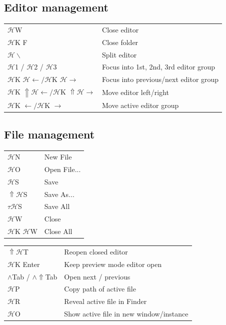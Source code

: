\documentclass[UTF8]{article}
\begin{document}
\subsection*{Editor management}
\begin{tabular}{ll}
$\mathscr{H}$W & Close editor \\
$\mathscr{H}$K F & Close folder \\
$\mathscr{H}\backslash$ & Split editor \\
$\mathscr{H}$1 / $\mathscr{H}$2 / $\mathscr{H}$3 & Focus into 1st, 2nd, 3rd editor group \\
$\mathscr{H}$K $\mathscr{H}\leftarrow / \mathscr{H}$K $\mathscr{H}\rightarrow$ & Focus into previous/next editor group \\
$\mathscr{H}$K $\Uparrow\mathscr{H}\leftarrow / \mathscr{H}$K $\Uparrow\mathscr{H}\rightarrow$ & Move editor left/right \\
$\mathscr{H}$K $\leftarrow / \mathscr{H}$K $\rightarrow$ & Move active editor group \\
\end{tabular}

\subsection*{File management}
\begin{tabular}{ll}
$\mathscr{H}$N & New File \\
$\mathscr{H}$O & Open File... \\
$\mathscr{H}$S & Save \\
$\Uparrow\mathscr{H}$S & Save As... \\
$\tau\mathscr{H}$S & Save All \\
$\mathscr{H}$W & Close \\
$\mathscr{H}$K $\mathscr{H}$W & Close All \\
\end{tabular}

\begin{tabular}{ll}
$\Uparrow\mathscr{H}$T & Reopen closed editor \\
$\mathscr{H}$K Enter & Keep preview mode editor open \\
$\wedge$Tab / $\wedge\Uparrow$Tab & Open next / previous \\
$\mathscr{H}$P & Copy path of active file \\
$\mathscr{H}$R & Reveal active file in Finder \\
$\mathscr{H}$O & Show active file in new window/instance \\
\end{tabular}
\end{document}
